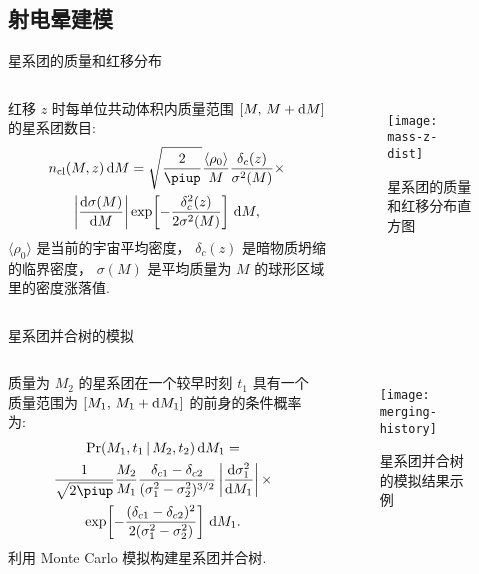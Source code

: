 \documentclass{beamer}
\begin{document}
\subsection{射电晕建模}

\begin{frame}{星系团的质量和红移分布}
  \begin{columns}
    红移 $z$ 时每单位共动体积内质量范围 $[M,\, M+\text{d}M]$ 的星系团数目:
    \begin{multline}
      n_{\R{cl}}(M,z) \,\D{M} =
        \sqrt{\frac{2}{\Cpi}} \frac{\langle \rho_0 \rangle}{M}
        \frac{\delta_c(z)}{\sigma^2(M)} \times \\
        \left| \diff{\sigma(M)}{M} \right|
        \exp\!\left[ -\frac{\delta_c^2(z)}{2\sigma^2(M)} \right]
        \,\D{M} ,
    \end{multline}
    $\langle \rho_0 \rangle$ 是当前的宇宙平均密度，
    $\delta_c(z)$ 是暗物质坍缩的临界密度，
    $\sigma(M)$ 是平均质量为 $M$ 的球形区域里的密度涨落值.

    \begin{figure}
      \centering
      \texttt{[image: mass-z-dist]}
      \caption{星系团的质量和红移分布直方图}
    \end{figure}
  \end{columns}
\end{frame}

\begin{frame}{星系团并合树的模拟}
  \begin{columns}
    质量为 $M_2$ 的星系团在一个较早时刻 $t_1$ 具有一个质量范围为
    $[M_1,\, M_1+\text{d}M_1]$ 的前身的条件概率为:
    \begin{multline}
      \R{Pr}(M_1, t_1 \,|\, M_2, t_2) \,\D{M_1} = \\
        \frac{1}{\sqrt{2\Cpi}} \frac{M_2}{M_1}
        \frac{\delta_{c1} - \delta_{c2}}{(\sigma_1^2 - \sigma_2^2)^{3/2}}
        \left| \diff{\sigma_1^2}{M_1} \right|
        \times \\
        \exp \!\left[ -\frac{(\delta_{c1} - \delta_{c2})^2}
        {2(\sigma_1^2 - \sigma_2^2)} \right] \,\D{M_1} .
    \end{multline}
    利用 Monte Carlo 模拟构建星系团\alert{并合树}.

    \begin{figure}
      \centering
      \texttt{[image: merging-history]}
      \caption{星系团并合树的模拟结果示例}
    \end{figure}
  \end{columns}
\end{frame}
\end{document}
